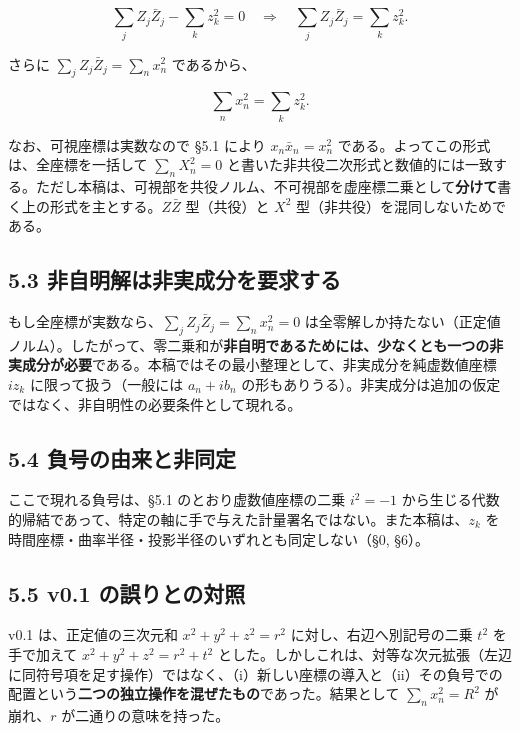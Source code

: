 \documentclass[11pt,a4paper]{ltjsarticle}
\begin{document}
\[
\sum_j Z_j\bar Z_j-\sum_k z_k^2=0
\quad\Longrightarrow\quad
\sum_j Z_j\bar Z_j=\sum_k z_k^2 .
\]

さらに \(\sum_j Z_j\bar Z_j=\sum_n x_n^2\) であるから、

\[
\sum_n x_n^2=\sum_k z_k^2 .
\]

なお、可視座標は実数なので §5.1 により \(x_n\bar x_n=x_n^2\)
である。よってこの形式は、全座標を一括して \(\sum_n X_n^2=0\)
と書いた非共役二次形式と数値的には一致する。ただし本稿は、可視部を共役ノルム、不可視部を虚座標二乗として\textbf{分けて}書く上の形式を主とする。\(Z\bar Z\)
型（共役）と \(X^2\) 型（非共役）を混同しないためである。

\subsection{5.3
非自明解は非実成分を要求する}\label{ux975eux81eaux660eux89e3ux306fux975eux5b9fux6210ux5206ux3092ux8981ux6c42ux3059ux308b}

もし全座標が実数なら、\(\sum_j Z_j\bar Z_j=\sum_n x_n^2=0\)
は全零解しか持たない（正定値ノルム）。したがって、零二乗和が\textbf{非自明であるためには、少なくとも一つの非実成分が必要}である。本稿ではその最小整理として、非実成分を純虚数値座標
\(i z_k\) に限って扱う（一般には \(a_n+i b_n\)
の形もありうる）。非実成分は追加の仮定ではなく、非自明性の必要条件として現れる。

\subsection{5.4
負号の由来と非同定}\label{ux8ca0ux53f7ux306eux7531ux6765ux3068ux975eux540cux5b9a}

ここで現れる負号は、§5.1 のとおり虚数値座標の二乗 \(i^2=-1\)
から生じる代数的帰結であって、特定の軸に手で与えた計量署名ではない。また本稿は、\(z_k\)
を時間座標・曲率半径・投影半径のいずれとも同定しない（§0, §6）。

\subsection{5.5 v0.1
の誤りとの対照}\label{v0.1-ux306eux8aa4ux308aux3068ux306eux5bfeux7167}

v0.1 は、正定値の三次元和 \(x^2+y^2+z^2=r^2\) に対し、右辺へ別記号の二乗
\(t^2\) を手で加えて \(x^2+y^2+z^2=r^2+t^2\)
とした。しかしこれは、対等な次元拡張（左辺に同符号項を足す操作）ではなく、（i）新しい座標の導入と（ii）その負号での配置という\textbf{二つの独立操作を混ぜたもの}であった。結果として
\(\sum_n x_n^2=R^2\) が崩れ、\(r\) が二通りの意味を持った。
\end{document}
